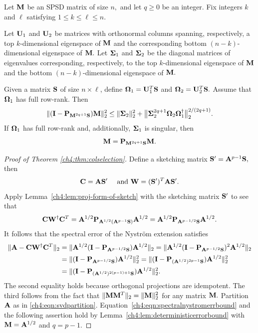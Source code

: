 \begin{lemma}
 Let $\mathbf{M}$ be an SPSD matrix of size $n,$ and let $q \geq 0$ be an integer. 
 Fix integers $k$ and $\ell$
satisfying $1 \leq k \leq \ell \leq n.$ 

Let $\mathbf{U}_1$ and $\mathbf{U}_2$ be matrices with orthonormal columns spanning,
respectively, a top $k$-dimensional eigenspace of $\mathbf{M}$ and the
corresponding bottom $(n-k)$-dimensional eigenspace of $\mathbf{M}.$ Let
$\mathbf{\Sigma}_1$ and $\mathbf{\Sigma}_2$ be the diagonal matrices of eigenvalues
corresponding, respectively, to the top $k$-dimensional eigenspace of
$\mathbf{M}$ and the bottom $(n-k)$-dimensional eigenspace of $\mathbf{M}.$ 

Given a matrix $\mathbf{S}$ of size $n \times \ell$, define $\mathbf{\Omega}_1 =
\mathbf{U}_1^T \mathbf{S}$ and $\mathbf{\Omega}_2 = \mathbf{U}_2^T \mathbf{S}.$ Assume
that $\mathbf{\Omega}_1$ has full row-rank. Then
\[
\| (\mathbf{I} - \mathbf{P}_{\mathbf{M}^{2q+1} \mathbf{S}}) \mathbf{M} \|_2^2 \leq \| \mathbf{\Sigma}_2
\|_2^2 + \big\| \mathbf{\Sigma}_2^{2q+1} \mathbf{\Omega}_2 \mathbf{\Omega}_1^\dagger \big \|_2^{2/(2q+1)}.
\]
If $\mathbf{\Omega}_1$ has full row-rank and, additionally, $\mathbf{\Sigma}_1$ is singular, then
\[
 \mathbf{M} = \mathbf{P}_{\mathbf{M}^{2q+1}\mathbf{S}}\mathbf{M}.
\]
 \label{ch4:lem:deterministicerrorbound}
\end{lemma}

\begin{proof}[Proof of Theorem \ref{ch4:thm:colselection}]
Define a sketching matrix $\mathbf{S}^\prime = \mathbf{A}^{p-1} \mathbf{S},$ then
\[ \mathbf{C} = \mathbf{A} \mathbf{S}^\prime \quad \text{ and } \mathbf{W} = (\mathbf{S}^\prime)^T \mathbf{A} \mathbf{S}^\prime.\]
Apply Lemma~\ref{ch4:lem:proj-form-of-sketch} with the sketching matrix $\mathbf{S}^\prime$ to see that
\[
\mathbf{C} \mathbf{W}^\dagger \mathbf{C}^T = \mathbf{A}^{1/2} \mathbf{P}_{\mathbf{A}^{1/2}(\mathbf{A}^{p-1} \mathbf{S})}\mathbf{A}^{1/2}
 = \mathbf{A}^{1/2} \mathbf{P}_{\mathbf{A}^{p-1/2} \mathbf{S}} \mathbf{A}^{1/2}.
\]
It follows that the spectral error of the Nystr\"om extension satisfies
\begin{align*}
  \|\mathbf{A} - \mathbf{C} \mathbf{W}^\dagger \mathbf{C}^T\|_2 & =
\|\mathbf{A}^{1/2} ( \mathbf{I} - \mathbf{P}_{\mathbf{A}^{p-1/2}\mathbf{S}}) \mathbf{A}^{1/2}\|_2
 = \|\mathbf{A}^{1/2} ( \mathbf{I} - \mathbf{P}_{\mathbf{A}^{p-1/2}\mathbf{S}})^2
\mathbf{A}^{1/2}\|_2\\ 
 & = \|( \mathbf{I} - \mathbf{P}_{\mathbf{A}^{p-1/2}\mathbf{S}}) \mathbf{A}^{1/2}\|_2^2
   = \|( \mathbf{I} - \mathbf{P}_{(\mathbf{A}^{1/2})^{2p-1} \mathbf{S}}) \mathbf{A}^{1/2}\|_2^2 \\
 & =  \|( \mathbf{I} - \mathbf{P}_{(\mathbf{A}^{1/2})^{2(p-1)+1} \mathbf{S}}) \mathbf{A}^{1/2}\|_2^2.
\end{align*}
The second equality holds because orthogonal projections are idempotent. The third
follows from the fact that $\|\mathbf{M}\mathbf{M}^T\|_2 = \|\mathbf{M}\|_2^2$ for
any matrix $\mathbf{M}.$ Partition $\mathbf{A}$ as in 
\eqref{ch4:eqn:svdpartition}. Equation~\eqref{ch4:eqn:spectralnystromerrbound} and the
following assertion hold by Lemma~\ref{ch4:lem:deterministicerrorbound} with
$\mathbf{M} = \mathbf{A}^{1/2}$ and $q = p-1.$ 
\end{proof}

